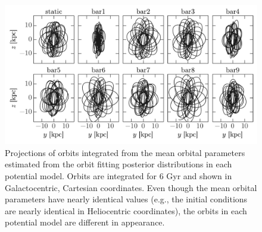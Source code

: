 \documentclass[letterpaper,12pt,preprint]{aastex}
\newcommand{\lyapexp}{\lambda_{\rm max}}
\newcommand{\lyapt}{t_\lambda}
\begin{document}
\clearpage
\begin{figure}[p]
\begin{center}
\includegraphics[width=\textwidth]{figures/orbit-yz}
\caption{  Projections of orbits integrated from the mean orbital parameters estimated from the orbit fitting posterior distributions in each potential model. Orbits are integrated for 6 Gyr and shown in Galactocentric, Cartesian coordinates. Even though the mean orbital parameters have nearly identical values (e.g., the initial conditions are nearly identical in Heliocentric coordinates), the orbits in each potential model are  different in appearance. }
\label{fig:orbits-yz}
\end{center}
\end{figure}

\end{document}
